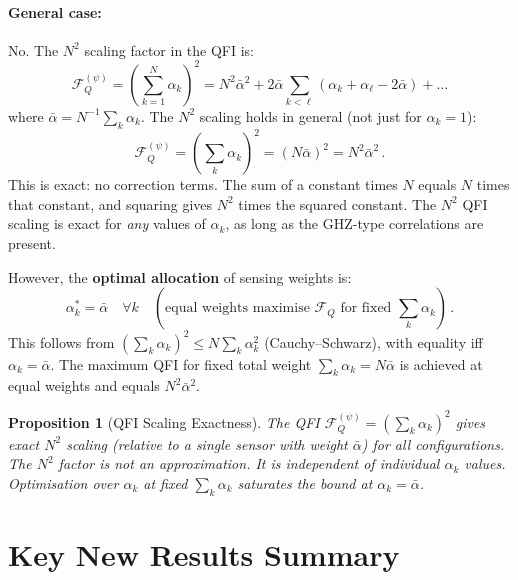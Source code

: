 \documentclass[11pt]{article}
\newtheorem{proposition}[theorem]{Proposition}
\theoremstyle{definition}
\theoremstyle{remark}
\begin{document}
\paragraph{General case:} No. The $N^2$ scaling factor in the QFI is:
\begin{equation}
\mathcal{F}_Q^{(\psi)} = \left(\sum_{k=1}^N \alpha_k\right)^2 =
N^2 \bar{\alpha}^2 + 2\bar{\alpha}\sum_{k<\ell}(\alpha_k + \alpha_\ell - 2\bar\alpha)
+ \ldots
\end{equation}
where $\bar\alpha = N^{-1}\sum_k\alpha_k$. The $N^2$ scaling holds in general
(not just for $\alpha_k = 1$):
\begin{equation}
\mathcal{F}_Q^{(\psi)} = \left(\sum_k \alpha_k\right)^2 = (N\bar\alpha)^2 =
N^2\bar\alpha^2\,.
\end{equation}
This is exact: no correction terms. The sum of a constant times $N$ equals $N$
times that constant, and squaring gives $N^2$ times the squared constant. The
$N^2$ QFI scaling is exact for \emph{any} values of $\alpha_k$, as long as
the GHZ-type correlations are present.

However, the \textbf{optimal allocation} of sensing weights is:
\begin{equation}
\alpha_k^* = \bar\alpha \quad \forall k \quad
(\text{equal weights maximise } \mathcal{F}_Q \text{ for fixed } \sum_k\alpha_k)\,.
\end{equation}
This follows from $(\sum_k \alpha_k)^2 \leq N \sum_k\alpha_k^2$ (Cauchy--Schwarz),
with equality iff $\alpha_k = \bar\alpha$. The maximum QFI for fixed total weight
$\sum_k\alpha_k = N\bar\alpha$ is achieved at equal weights and equals $N^2\bar\alpha^2$.

\begin{proposition}[QFI Scaling Exactness]
\label{prop:qfi-scaling}
The QFI $\mathcal{F}_Q^{(\psi)} = (\sum_k\alpha_k)^2$ gives exact $N^2$
scaling (relative to a single sensor with weight $\bar\alpha$) for all
configurations. The $N^2$ factor is not an approximation. It is independent
of individual $\alpha_k$ values. Optimisation over $\alpha_k$ at fixed
$\sum_k\alpha_k$ saturates the bound at $\alpha_k = \bar\alpha$.
\end{proposition}

\section{Key New Results Summary}
\label{sec:summary}
\end{document}
